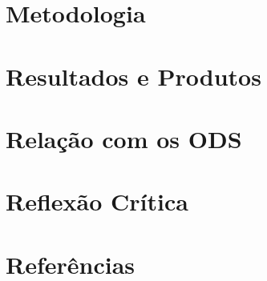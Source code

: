 \documentclass[12pt,a4paper]{article}
\begin{document}

\section*{Metodologia}




\section*{Resultados e Produtos}




\section*{Relação com os ODS}




\section*{Reflexão Crítica }




\section*{Referências}
\end{document}
